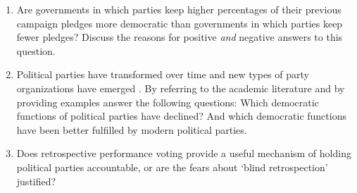 \documentclass[abstract=on,parskip=full,headings=standardclasses,fontsize=11pt,paper=a4]{scrartcl}
\begin{document}
\begin{enumerate}


\item Are governments in which parties keep higher percentages of their previous campaign pledges more democratic than governments in which parties keep fewer pledges? Discuss the reasons for positive \textit{and} negative answers to this question.

\item Political parties have transformed  over time and new types of party organizations have emerged \autocite{katz95,katz09}. By referring to the academic literature and by providing examples answer the following questions: Which democratic functions of political parties have declined? And which democratic functions have been better fulfilled by modern political parties.







\item Does retrospective performance voting provide a useful mechanism of holding political parties accountable, or are the fears about `blind retrospection' justified?




\end{enumerate}
\end{document}
